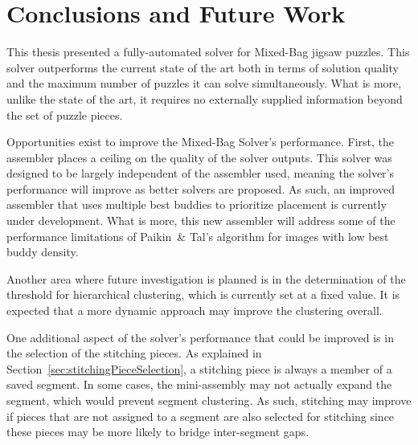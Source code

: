 \chapter{Conclusions and Future Work}

This thesis presented a fully-automated solver for Mixed-Bag jigsaw puzzles.  This solver outperforms the current state of the art both in terms of solution quality and the maximum number of puzzles it can solve simultaneously.  What is more, unlike the state of the art, it requires no externally supplied information beyond the set of puzzle pieces.

Opportunities exist to improve the Mixed-Bag Solver's performance.  First, the assembler places a ceiling on the quality of the solver outputs.  This solver was designed to be largely independent of the assembler used, meaning the solver's performance will improve as better solvers are proposed. As such, an improved assembler that uses multiple best buddies to prioritize placement is currently under development.  What is more, this new assembler will address some of the performance limitations of Paikin~\& Tal's algorithm for images with low best buddy density.

Another area where future investigation is planned is in the determination of the threshold for hierarchical clustering, which is currently set at a fixed value.  It is expected that a more dynamic approach may improve the clustering overall.

One additional aspect of the solver's performance that could be improved is in the selection of the stitching pieces.  As explained in Section~\ref{sec:stitchingPieceSelection}, a stitching piece is always a member of a saved segment.  In some cases, the mini-assembly may not actually expand the segment, which would prevent segment clustering.  As such, stitching may improve if pieces that are not assigned to a segment are also selected for stitching since these pieces may be more likely to bridge inter-segment gaps.